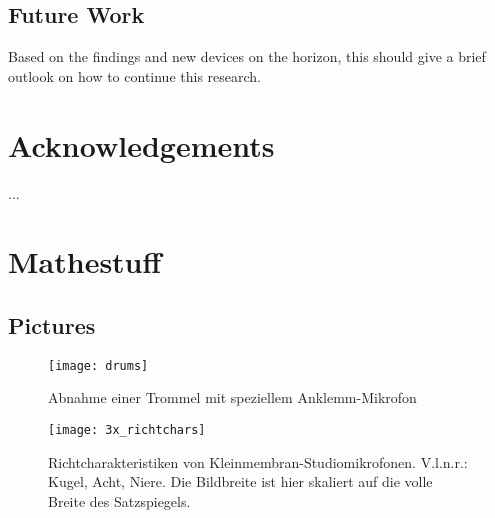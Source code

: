         \section{Future Work}

            Based on the findings and new devices on the horizon, this should give a brief outlook on how to continue this research.

    \chapter{Acknowledgements}

        ...




    \chapter{Mathestuff}

        \section{Pictures}

            \begin{figure}[htp]     %
                \centering
                \texttt{[image: drums]} 
                \caption{Abnahme einer Trommel mit speziellem Anklemm-Mikrofon}\label{trommelmik}
                \end{figure}
    
            \begin{figure}[htp]     %
                \centering
                \texttt{[image: 3x\_richtchars]}
                \caption[Richtcharakteristiken von Kleinmembran-Studiomikrofonen]{Richtcharakteristiken von Kleinmembran-Studiomikrofonen. V.l.n.r.: Kugel, Acht, Niere. Die Bildbreite ist hier skaliert auf die volle Breite des Satzspiegels.}\label{richtch}
                \end{figure}

